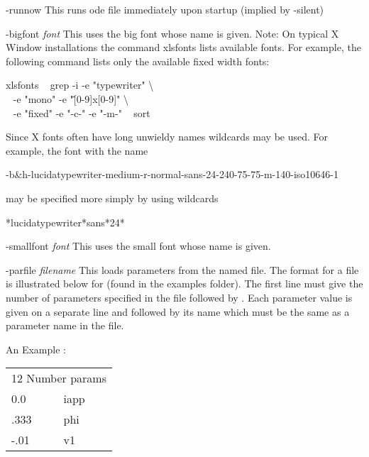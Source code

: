 \begin{description}
\item{-runnow} This runs ode file immediately upon startup (implied by -silent)
\item{-bigfont \emph{font}} This uses the big font whose name is given. Note:  On  typical  X  Window  installations the command xlsfonts lists
       available fonts.  For example, the following  command  lists  only  the
       available fixed width fonts:
\begin{center}\ttfamily\begin{minipage}{55ex}
              xlsfonts \textbar~ grep -i -e "typewriter" \textbackslash \\
                     $~~$ -e "mono" -e "\^[0-9]x[0-9]" \textbackslash \\
                     $~~$ -e "fixed" -e "-c-" -e "-m-" \textbar~ sort
\end{minipage}\end{center}
Since X fonts often have long unwieldy names wildcards may be used.  For example, the font with the name
\begin{center}\ttfamily
	-b\&h-lucidatypewriter-medium-r-normal-sans-24-240-75-75-m-140-iso10646-1
\end{center}
may be specified more simply by using wildcards
\begin{center}\ttfamily
*lucidatypewriter*sans*24*
\end{center}
\item{-smallfont \emph{font}} This uses the small font whose name is given.
\item{-parfile \emph{filename}} This loads parameters from the named file. The format for a {} file is illustrated below for {} (found in the examples {} folder).  The first line must give the number of parameters specified in the file followed by {}.  Each parameter value is given on a separate line and followed by its name which must be the same as a parameter name in the {} file. 
\begin{center}
\begin{minipage}{55ex}
\begin{center}An Example {}:
\end{center}\ttfamily
\begin{tabular}{ll}
\multicolumn{2}{l}{12 Number params}\\
0.0 & iapp\\
.333 & phi\\
-.01 & v1\\

\end{tabular}
\end{minipage}
\end{center}
\end{description}
